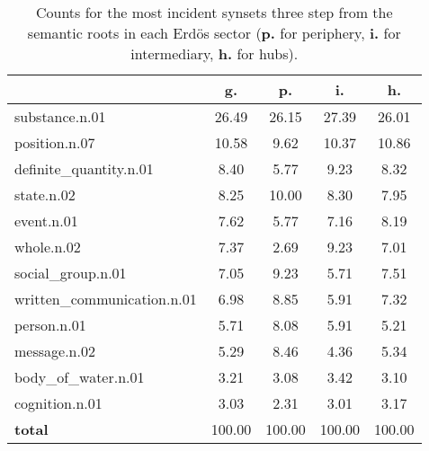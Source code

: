 \begin{table}[h!]
\begin{center}
\begin{tabular}{| l || c | c | c | c |}\hline
 & {\bf g.} & {\bf p.} & {\bf i.} & {\bf h.} \\\hline\hline
substance.n.01 & 26.49  & 26.15  & 27.39  & 26.01 \\\hline
position.n.07 & 10.58  & 9.62  & 10.37  & 10.86 \\\hline
definite\_quantity.n.01 & 8.40  & 5.77  & 9.23  & 8.32 \\\hline
state.n.02 & 8.25  & 10.00  & 8.30  & 7.95 \\\hline
event.n.01 & 7.62  & 5.77  & 7.16  & 8.19 \\\hline
whole.n.02 & 7.37  & 2.69  & 9.23  & 7.01 \\\hline
social\_group.n.01 & 7.05  & 9.23  & 5.71  & 7.51 \\\hline
written\_communication.n.01 & 6.98  & 8.85  & 5.91  & 7.32 \\\hline
person.n.01 & 5.71  & 8.08  & 5.91  & 5.21 \\\hline
message.n.02 & 5.29  & 8.46  & 4.36  & 5.34 \\\hline
body\_of\_water.n.01 & 3.21  & 3.08  & 3.42  & 3.10 \\\hline
cognition.n.01 & 3.03  & 2.31  & 3.01  & 3.17 \\\hline\hline
{{\bf total}} & 100.00  & 100.00  & 100.00  & 100.00 \\\hline
\end{tabular}
\caption{Counts for the most incident synsets three step from the semantic roots in each Erd\"os sector ({\bf p.} for periphery, {\bf i.} for intermediary, {\bf h.} for hubs).}
\end{center}
\end{table}

